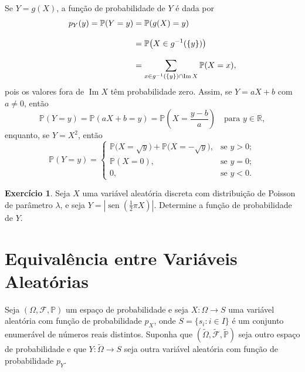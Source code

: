 \documentclass[12pt,portuguese]{article}
\theoremstyle{definition}
\newtheorem{exercise}{Exercício}
\renewcommand{\sin}{\operatorname{sen}}
\begin{document}
Se \(Y = g(X)\), a função de probabilidade de \(Y\) é dada por
\begin{align}
  p_Y(y) = \mathbb{P}(Y = y)
         &= \mathbb{P}(g(X) = y)
         \notag \\[0.3cm]
         &= \mathbb{P}\big(X \in g^{-1}(\{y\})\big)
         \notag \\[0.3cm]
         &= \sum_{x \in g^{-1}(\{y\})\cap\operatorname{Im}X}
            \mathbb{P}(X = x), \label{eq:massa-de-funcao-de-va}
\end{align}
pois os valores fora de \(\operatorname{Im}X\) têm probabilidade zero. Assim,
se \(Y = aX + b\) com \(a \neq 0\), então
\[
  \mathbb{P}(Y = y) = \mathbb{P}(aX + b = y)
    = \mathbb{P}\left(X = \frac{y-b}{a}\right)
    \quad \text{para } y \in \mathbb{R},
\]
enquanto, se \(Y = X^2\), então
\[
  \mathbb{P}(Y = y) =
  \begin{cases}
    \mathbb{P}\big(X = \sqrt{y}\big) + \mathbb{P}\big(X = -\sqrt{y}\big),
      & \text{se } y > 0; \\[0.4cm]
    \mathbb{P}(X = 0), & \text{se } y = 0; \\[0.4cm]
    0, & \text{se } y < 0.
  \end{cases}
\]

\begin{exercise}\label{exercise:poisson-seno}
  Seja \(X\) uma variável aleatória discreta com distribuição de Poisson de
  parâmetro \(\lambda\), e seja \(Y = |\sin(\tfrac{1}{2}\pi X)|\).
  Determine a função de probabilidade de \(Y\).
\end{exercise}


\section{Equivalência entre Variáveis Aleatórias}

Seja \((\Omega,\mathcal{F},\mathbb{P})\) um espaço de probabilidade e seja
\(X:\Omega\to S\) uma variável aleatória com função de probabilidade \(p_X\),
onde \(S = \{s_i : i \in I\}\) é um conjunto enumerável de números reais distintos.
Suponha que \((\widetilde{\Omega},\widetilde{\mathcal{F}},\widetilde{\mathbb{P}})\)
seja outro espaço de probabilidade e que
\(Y:\widetilde{\Omega}\to S\) seja outra variável aleatória com função de
probabilidade \(p_Y\).
\end{document}
